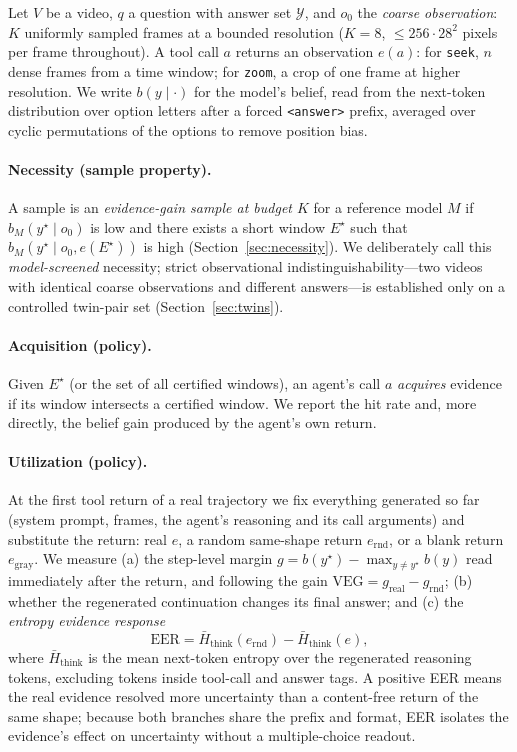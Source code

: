 \documentclass{article}
\newcommand{\estar}{E^{\star}}
\begin{document}
Let $V$ be a video, $q$ a question with answer set $\mathcal{Y}$, and $o_0$ the \emph{coarse observation}: $K$ uniformly sampled frames at a bounded resolution ($K{=}8$, $\le 256\!\cdot\!28^2$ pixels per frame throughout). A tool call $a$ returns an observation $e(a)$: for \texttt{seek}, $n$ dense frames from a time window; for \texttt{zoom}, a crop of one frame at higher resolution. We write $b(y\mid \cdot)$ for the model's belief, read from the next-token distribution over option letters after a forced \texttt{<answer>} prefix, averaged over cyclic permutations of the options to remove position bias.

\paragraph{Necessity (sample property).} A sample is an \emph{evidence-gain sample at budget $K$} for a reference model $M$ if $b_M(y^\star\mid o_0)$ is low and there exists a short window $\estar$ such that $b_M(y^\star\mid o_0, e(\estar))$ is high (Section~\ref{sec:necessity}). We deliberately call this \emph{model-screened} necessity; strict observational indistinguishability---two videos with identical coarse observations and different answers---is established only on a controlled twin-pair set (Section~\ref{sec:twins}).

\paragraph{Acquisition (policy).} Given $\estar$ (or the set of all certified windows), an agent's call $a$ \emph{acquires} evidence if its window intersects a certified window. We report the hit rate and, more directly, the belief gain produced by the agent's own return.

\paragraph{Utilization (policy).} At the first tool return of a real trajectory we fix everything generated so far (system prompt, frames, the agent's reasoning and its call arguments) and substitute the return: real $e$, a random same-shape return $e_{\mathrm{rnd}}$, or a blank return $e_{\mathrm{gray}}$. We measure (a) the step-level margin $g = b(y^\star) - \max_{y\neq y^\star} b(y)$ read immediately after the return, and following \citet{illusion2026} the gain $\mathrm{VEG} = g_{\mathrm{real}} - g_{\mathrm{rnd}}$; (b) whether the regenerated continuation changes its final answer; and (c) the \emph{entropy evidence response}
\begin{equation}
\mathrm{EER} = \bar H_{\mathrm{think}}(e_{\mathrm{rnd}}) - \bar H_{\mathrm{think}}(e),
\end{equation}
where $\bar H_{\mathrm{think}}$ is the mean next-token entropy over the regenerated reasoning tokens, excluding tokens inside tool-call and answer tags. A positive EER means the real evidence resolved more uncertainty than a content-free return of the same shape; because both branches share the prefix and format, EER isolates the evidence's effect on uncertainty without a multiple-choice readout.
\end{document}
